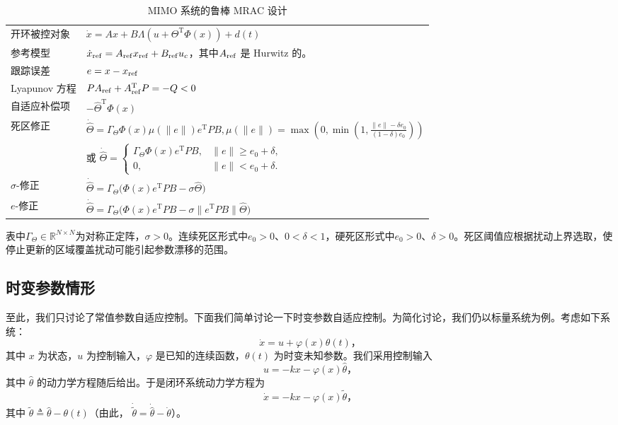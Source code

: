 \begin{table}[htbp]
  \centering
  \setcellgapes{4pt}
  \makegapedcells
  \caption{MIMO 系统的鲁棒 MRAC 设计}
  \label{table:MIMO_robust_MRAC}
  \begin{tabular}{p{4.0cm}p{10.0cm}}
  \hline
   开环被控对象 & $\dot{x} =  A x + B \Lambda \left( u + \Theta^\mathrm{T} \Phi(x) \right) + d(t)$\\
    参考模型 & $\dot{x}_{\operatorname{ref}} = 
    A_{\operatorname{ref}} x_{\operatorname{ref}} +
    B_{\operatorname{ref}} u_c$，其中$A_{\operatorname{ref}}$ 是 Hurwitz 的。\\
    跟踪误差 & $e = x - x_{\operatorname{ref}}$\\
    Lyapunov 方程 & $P A_{\operatorname{ref}} + A_{\operatorname{ref}}^{\mathrm{T}} P = -Q < 0$\\
    自适应补偿项 & $-{\hat{\Theta}}^{\mathrm{T}} \Phi(x)$\\
    死区修正 & $
        \dot{\hat\Theta}=\Gamma_\Theta\Phi(x)\mu(\|e\|)e^{\mathrm{T}}PB,
        \mu(\|e\|)=\max\left(0,\min\left(1,\frac{\|e\|-\delta e_0}{(1-\delta)e_0}\right)\right)$\\
    & 或 $\displaystyle\dot{\hat\Theta}=\begin{cases}
        \Gamma_\Theta\Phi(x)e^{\mathrm{T}}PB,&\|e\|\geq e_0+\delta,\\
        0,&\|e\|<e_0+\delta.
    \end{cases}$\\
    $\sigma$-修正 & $\dot{\hat\Theta}=\Gamma_\Theta\bigl(\Phi(x)e^{\mathrm{T}}PB-\sigma\hat\Theta\bigr)$\\
    $e$-修正 & $\dot{\hat\Theta}=\Gamma_\Theta\bigl(\Phi(x)e^{\mathrm{T}}PB-\sigma\|e^{\mathrm{T}}PB\|\hat\Theta\bigr)$\\
    \hline
  \end{tabular}
\end{table}

表中$\Gamma_\Theta\in\mathbb{R}^{N\times N}$为对称正定阵，$\sigma>0$。连续死区形式中$e_0>0$、$0<\delta<1$，硬死区形式中$e_0>0$、$\delta>0$。死区阈值应根据扰动上界选取，使停止更新的区域覆盖扰动可能引起参数漂移的范围。

\subsection{时变参数情形}

至此，我们只讨论了常值参数自适应控制。下面我们简单讨论一下时变参数自适应控制。为简化讨论，我们仍以标量系统为例。考虑如下系统：
\begin{equation}
    \dot{x} = u + \varphi(x) \theta(t) \text{，}
\end{equation}
其中 $x$ 为状态，$u$ 为控制输入，$\varphi$ 是已知的连续函数，$\theta(t)$ 为时变未知参数。我们采用控制输入
\[
    u = -k x - \varphi(x) \hat{\theta} \text{，}
\]
其中 $\hat{\theta}$ 的动力学方程随后给出。于是闭环系统动力学方程为
\[
    \dot{x} = -k x - \varphi(x) \tilde{\theta} \text{，}
\]
其中 $\tilde{\theta} \triangleq \hat{\theta} - \theta(t)$（由此， $\dot{\tilde{\theta}} = \dot{\hat{\theta}} - \dot{\theta}$）。

